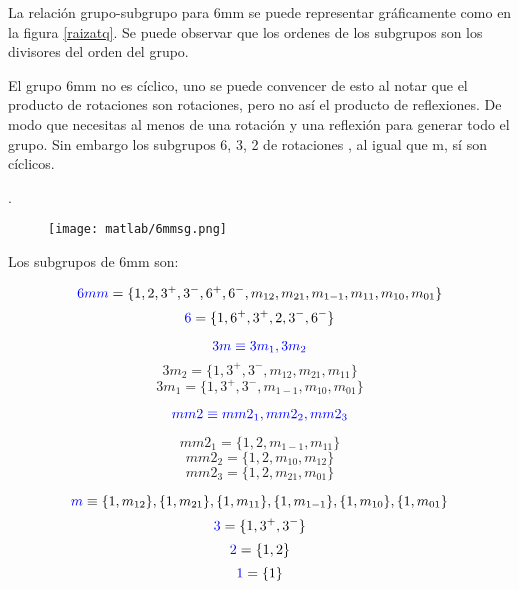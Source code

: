 \documentclass{report}
\begin{document}
\raggedright



La relación grupo-subgrupo para 6mm se puede representar gráficamente como en la figura \ref{raizatq}. Se puede observar que los ordenes de los subgrupos son los divisores del orden del grupo. \\

\vspace{.2cm}


El grupo 6mm no es cíclico, uno se puede convencer de esto al notar que el producto de rotaciones son rotaciones, pero no así el producto de reflexiones. De modo que necesitas al menos de una rotación y una reflexión para generar todo el grupo. Sin embargo los subgrupos 6, 3, 2 de rotaciones , al igual que m, sí son cíclicos.

.\\
\vspace{.2cm}







\newpage


\begin{figure}[h!]
\centering
\texttt{[image: matlab/6mmsg.png]}
\end{figure}


\begin{multicols}{2}



Los subgrupos de 6mm son:


\[\textcolor{blue}{  6mm}=
\{1, 2, 3^+, 3^-, 6^+, 6^-, m_{12}, m_{21}, m_{1-1}, m_{11}, m_{10}, m_{01} \}
\]
\[\textcolor{blue}{6}=
\{1, 6^+, 3^+, 2, 3^-, 6^-\}  
\]


\[\textcolor{blue}{
3m \equiv 3m_1, 3m_2}
\]
\[
3m_2 = \{1, 3^+, 3^-, m_{12}, m_{21}, m_{11}\}
\]
\[
3m_1 = \{1, 3^+, 3^-, m_{1-1}, m_{10}, m_{01}\}
\]
\columnbreak

\[\textcolor{blue}{
mm2 \equiv mm2_1, mm2_2, mm2_3}
\]

\[
mm2_1 = \{1, 2, m_{1-1}, m_{11}\}
\]
\[
mm2_2 = \{1, 2, m_{10}, m_{12}\}
\]
\[
mm2_3 = \{1, 2, m_{21}, m_{01}\}
\]

\[\textcolor{blue}{  
m} \equiv \{1, m_{12}\}, \{1, m_{21}\}, \{1, m_{11}\}, \{1, m_{1-1}\}, \{1, m_{10}\}, \{1, m_{01}\}
\]
\[\textcolor{blue}{ 3}=
\{1, 3^+, 3^-\} 
\]
\[\textcolor{blue}{  2}=
\{1, 2\} 
\]
\[\textcolor{blue}{1}=
\{1\} 
\]


\end{multicols}
\newpage
\end{document}
